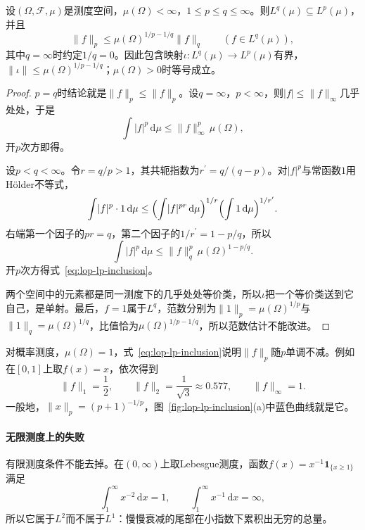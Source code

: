 \begin{theorem}[有限测度上的Lᵖ包含]
\label{thm:lop-lp-inclusion}
设$(\Omega,\mathcal F,\mu)$是测度空间，$\mu(\Omega)<\infty$，$1\leq p\leq q\leq\infty$。则$L^q(\mu)\subseteq L^p(\mu)$，并且
\begin{equation}
 \lVert f\rVert_p\leq\mu(\Omega)^{1/p-1/q}\lVert f\rVert_q\qquad(f\in L^q(\mu)),
 \label{eq:lop-lp-inclusion}
\end{equation}
其中$q=\infty$时约定$1/q=0$。因此包含映射$\iota:L^q(\mu)\to L^p(\mu)$有界，$\lVert\iota\rVert\leq\mu(\Omega)^{1/p-1/q}$；$\mu(\Omega)>0$时等号成立。
\end{theorem}

\begin{proof}
$p=q$时结论就是$\lVert f\rVert_p\leq\lVert f\rVert_p$。设$q=\infty$，$p<\infty$，则$\lvert f\rvert\leq\lVert f\rVert_\infty$几乎处处，于是
\[
 \int\lvert f\rvert^p\,\mathrm d\mu\leq\lVert f\rVert_\infty^p\,\mu(\Omega),
\]
开$p$次方即得。

设$p<q<\infty$。令$r=q/p>1$，其共轭指数为$r^\prime=q/(q-p)$。对$\lvert f\rvert^p$与常函数$1$用Hölder不等式，
\[
 \int\lvert f\rvert^p\cdot1\,\mathrm d\mu
 \leq\Bigl(\int\lvert f\rvert^{pr}\,\mathrm d\mu\Bigr)^{1/r}\Bigl(\int1\,\mathrm d\mu\Bigr)^{1/r^\prime}.
\]
右端第一个因子的$pr=q$，第二个因子的$1/r^\prime=1-p/q$，所以
\[
 \int\lvert f\rvert^p\,\mathrm d\mu\leq\lVert f\rVert_q^p\,\mu(\Omega)^{1-p/q}.
\]
开$p$次方得式~\eqref{eq:lop-lp-inclusion}。

两个空间中的元素都是同一测度下的几乎处处等价类，所以$\iota$把一个等价类送到它自己，是单射。最后，$f=1$属于$L^q$，范数分别为$\lVert1\rVert_p=\mu(\Omega)^{1/p}$与$\lVert1\rVert_q=\mu(\Omega)^{1/q}$，比值恰为$\mu(\Omega)^{1/p-1/q}$，所以范数估计不能改进。
\end{proof}

对概率测度，$\mu(\Omega)=1$，式~\eqref{eq:lop-lp-inclusion}说明$\lVert f\rVert_p$随$p$单调不减。例如在$[0,1]$上取$f(x)=x$，依次得到
\[
 \lVert f\rVert_1=\frac12,\qquad\lVert f\rVert_2=\frac1{\sqrt3}\approx0.577,\qquad\lVert f\rVert_\infty=1.
\]
一般地，$\lVert x\rVert_p=(p+1)^{-1/p}$，图~\ref{fig:lop-lp-inclusion}(a)中蓝色曲线就是它。

\paragraph{无限测度上的失败}
有限测度条件不能去掉。在$(0,\infty)$上取Lebesgue测度，函数$f(x)=x^{-1}\mathbf 1_{\{x\geq1\}}$满足
\[
 \int_1^\infty x^{-2}\,\mathrm dx=1,\qquad\int_1^\infty x^{-1}\,\mathrm dx=\infty,
\]
所以它属于$L^2$而不属于$L^1$：慢慢衰减的尾部在小指数下累积出无穷的总量。

